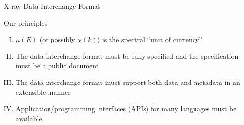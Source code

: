 \documentclass[final]{beamer}
\begin{document}
\begin{frame}{}
\begin{columns}[t]
\begin{column}{.55\linewidth}
\begin{block}{\large X-ray Data Interchange Format}
          \vspace{4mm}

          \begin{block}{\large Our principles}
            \begin{enumerate}[I.] \normalsize
            \item $\mu(E)$ (or possibly $\chi(k)$) is the spectral ``unit of currency''
            \item The data interchange format must be fully specified
              and the specification must be a public document
            \item The data interchange format must support both data and
              metadata in an extensible manner
            \item Application/programming interfaces (APIs) for many
              languages must be available
            \end{enumerate}
          \end{block}
        \end{block}
      \end{column}


\end{columns}
\end{frame}
\end{document}

